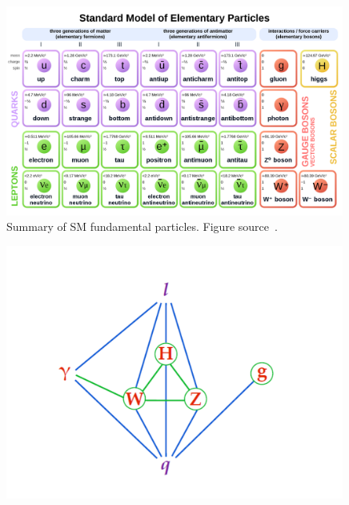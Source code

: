 \begin{figure}[t!]
\centering
\includegraphics[width=0.99\textwidth]{figures/SMtable.png}
\caption[Summary of standard model fundamental particles]{Summary of SM fundamental particles. Figure source~\cite{SMtable}.
\label{fig:SMParticles}}
\end{figure}

\begin{figure}[t!]
\centering
\includegraphics[width=0.99\textwidth]{figures/SM_coupling.png}
\caption[interactions between fundamental particles]{
\label{fig:SMcoupling}}
\end{figure}

